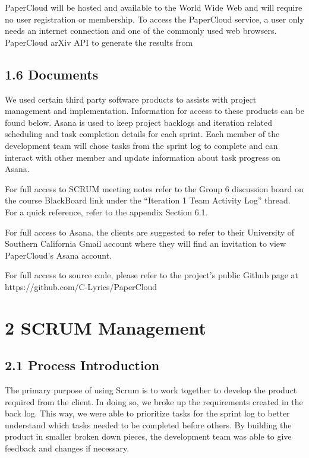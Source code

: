 \documentclass[]{article}
\begin{document}
PaperCloud will be hosted and available to the World Wide Web and will
require no user registration or membership. To access the PaperCloud
service, a user only needs an internet connection and one of the
commonly used web browsers. PaperCloud arXiv API to generate the results
from

\subsection{1.6 Documents}\label{documents}

We used certain third party software products to assists with project
management and implementation. Information for access to these products
can be found below. Asana is used to keep project backlogs and iteration
related scheduling and task completion details for each sprint. Each
member of the development team will chose tasks from the sprint log to
complete and can interact with other member and update information about
task progress on Asana.

For full access to SCRUM meeting notes refer to the Group 6 discussion
board on the course BlackBoard link under the ``Iteration 1 Team
Activity Log'' thread. For a quick reference, refer to the appendix
Section 6.1.

For full access to Asana, the clients are suggested to refer to their
University of Southern California Gmail account where they will find an
invitation to view PaperCloud's Asana account.

For full access to source code, please refer to the project's public
Github page at https://github.com/C-Lyrics/PaperCloud

\section{2 SCRUM Management}\label{scrum-management}

\subsection{2.1 Process Introduction}\label{process-introduction}

The primary purpose of using Scrum is to work together to develop the
product required from the client. In doing so, we broke up the
requirements created in the back log. This way, we were able to
prioritize tasks for the sprint log to better understand which tasks
needed to be completed before others. By building the product in smaller
broken down pieces, the development team was able to give feedback and
changes if necessary.
\end{document}
